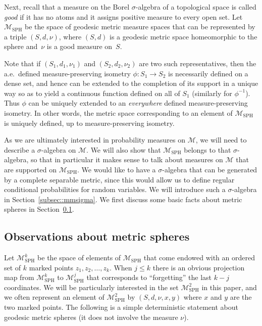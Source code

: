 \documentclass[JEP,XML,SOM,Unicode]{cedram}
\let\mathcal\mathscr
\theoremstyle{plain}
\numberwithin{theorem}{section}
\theoremstyle{definition}
\newcommand\gmsspace{{\mathcal M}_{\mathrm{SPH}}}
\newcommand\mmspace{{\mathcal M}}
\begin{document}
Next, recall that a measure on the Borel $\sigma$-algebra of a topological space is called \emph{good} if it has no atoms and it assigns positive measure to every open set. Let~$\gmsspace$ be the space of geodesic metric measure spaces that can be represented by a triple $(S,d,\nu)$, where $(S,d)$ is a geodesic metric space homeomorphic to the sphere and~$\nu$ is a good measure on~$S$.

Note that if $(S_1, d_1, \nu_1)$ and $(S_2, d_2, \nu_2)$ are two such representatives, then the a.e.\ defined measure-preserving isometry $\phi \colon S_1 \to S_2$ is necessarily defined on a dense set, and hence can be extended to the completion of its support in a unique way so as to yield a continuous function defined on all of $S_1$ (similarly for $\phi^{-1}$). Thus $\phi$ can be uniquely extended to an \emph{everywhere} defined measure-preserving isometry. In other words, the metric space corresponding to an element of $\gmsspace$ is uniquely defined, up to measure-preserving isometry.

As we are ultimately interested in probability measures on $\mmspace$, we will need to describe a $\sigma$-algebra on $\mmspace$. We will also show that $\gmsspace$ belongs to that $\sigma$-algebra, so that in particular it makes sense to talk about measures on $\mmspace$ that are supported on $\gmsspace$. We would like to have a $\sigma$-algebra that can be generated by a complete separable metric, since this would allow us to define regular conditional probabilities for random variables. We will introduce such a $\sigma$-algebra in Section~\ref{subsec::mmsigma}. We first discuss some basic facts about metric spheres in Section~\ref{subsec::metricsphereobservations}.

\subsection{Observations about metric spheres}
\label{subsec::metricsphereobservations}

Let $\gmsspace^k$ be the space of elements of $\gmsspace$ that come endowed with an ordered set of $k$ marked points $z_1, z_2, \ldots, z_k$. When $j \leq k$ there is an obvious projection map from $\gmsspace^k$ to $\gmsspace^j$ that corresponds to ``forgetting'' the last $k-j$ coordinates. We will be particularly interested in the set $\gmsspace^2$ in this paper, and we often represent an element of $\gmsspace^2$ by $(S, d, \nu, x,y)$ where $x$ and $y$ are the two marked points. The following is a simple deterministic statement about geodesic metric spheres (\ie it does not involve the measure $\nu$).
\end{document}
